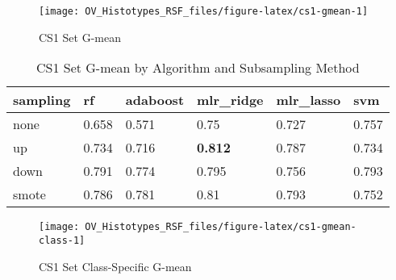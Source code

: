 \documentclass[
]{report}
\begin{document}
\begin{figure}[H]

{\centering \texttt{[image: OV\_Histotypes\_RSF\_files/figure-latex/cs1-gmean-1]} 

}

\caption{CS1 Set G-mean}\label{fig:cs1-gmean}
\end{figure}

\begin{table}

\caption{\label{tab:cs1-gmean-table}CS1 Set G-mean by Algorithm and Subsampling Method}
\centering
\begin{tabular}[t]{l|l|l|l|l|l}
\hline
sampling & rf & adaboost & mlr\_ridge & mlr\_lasso & svm\\
\hline
none & 0.658 & 0.571 & 0.75 & 0.727 & 0.757\\
\hline
up & 0.734 & 0.716 & \textbf{0.812} & 0.787 & 0.734\\
\hline
down & 0.791 & 0.774 & 0.795 & 0.756 & 0.793\\
\hline
smote & 0.786 & 0.781 & 0.81 & 0.793 & 0.752\\
\hline
\end{tabular}
\end{table}

\begin{figure}[H]

{\centering \texttt{[image: OV\_Histotypes\_RSF\_files/figure-latex/cs1-gmean-class-1]} 

}

\caption{CS1 Set Class-Specific G-mean}\label{fig:cs1-gmean-class}
\end{figure}
\end{document}
